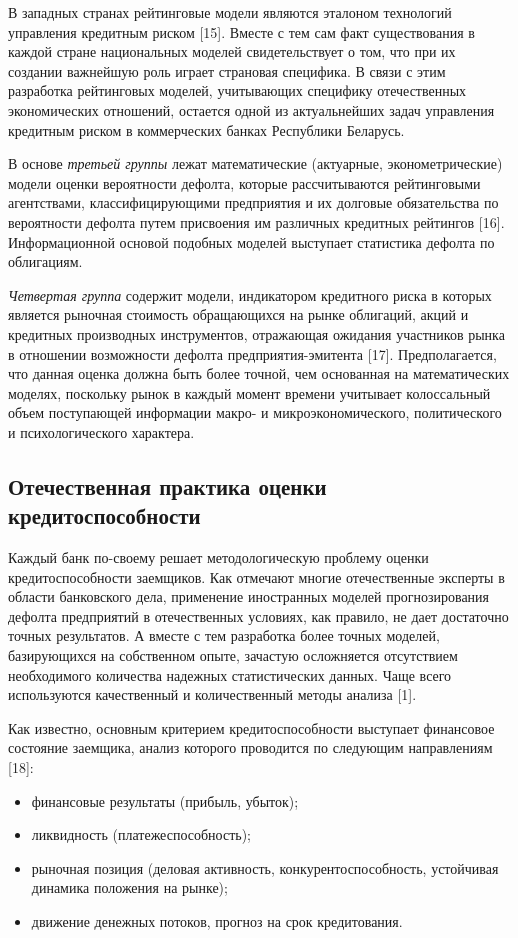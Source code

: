 \documentclass[14pt,a4paper]{extarticle}
\begin{document}
В западных странах рейтинговые модели являются эталоном технологий управления кредитным риском [15]. 
Вместе с тем сам факт существования в каждой стране национальных моделей свидетельствует о том, что 
при их создании важнейшую роль играет страновая специфика. В связи с этим разработка рейтинговых моделей, 
учитывающих специфику отечественных экономических отношений, остается одной из актуальнейших задач 
управления кредитным риском в коммерческих банках Республики Беларусь.

В основе \textit{третьей группы} лежат математические (актуарные, эконометрические) модели оценки 
вероятности дефолта, которые рассчитываются рейтинговыми агентствами, классифицирующими предприятия и 
их долговые обязательства по вероятности дефолта путем присвоения им различных кредитных рейтингов [16]. 
Информационной основой подобных моделей выступает статистика дефолта по облигациям.

\textit{Четвертая группа} содержит модели, индикатором кредитного риска в которых является рыночная 
стоимость обращающихся на рынке облигаций, акций и кредитных производных инструментов, отражающая 
ожидания участников рынка в отношении возможности дефолта предприятия-эмитента [17]. Предполагается, 
что данная оценка должна быть более точной, чем основанная на математических моделях, поскольку рынок 
в каждый момент времени учитывает колоссальный объем поступающей информации макро- и микроэкономического, 
политического и психологического характера.

\subsection{Отечественная практика оценки кредитоспособности}

Каждый банк по-своему решает методологическую проблему оценки кредитоспособности заемщиков. Как отмечают 
многие отечественные эксперты в области банковского дела, применение иностранных моделей прогнозирования 
дефолта предприятий в отечественных условиях, как правило, не дает достаточно точных результатов. А 
вместе с тем разработка более точных моделей, базирующихся на собственном опыте, зачастую осложняется 
отсутствием необходимого количества надежных статистических данных. Чаще всего используются качественный 
и количественный методы анализа [1].

Как известно, основным критерием кредитоспособности выступает финансовое состояние заемщика, анализ 
которого проводится по следующим направлениям [18]:
\begin{itemize}
    \item финансовые результаты (прибыль, убыток);
    \item ликвидность (платежеспособность);
    \item рыночная позиция (деловая активность, конкурентоспособность, устойчивая динамика положения на 
    рынке);
    \item движение денежных потоков, прогноз на срок кредитования.
\end{itemize}
\end{document}
